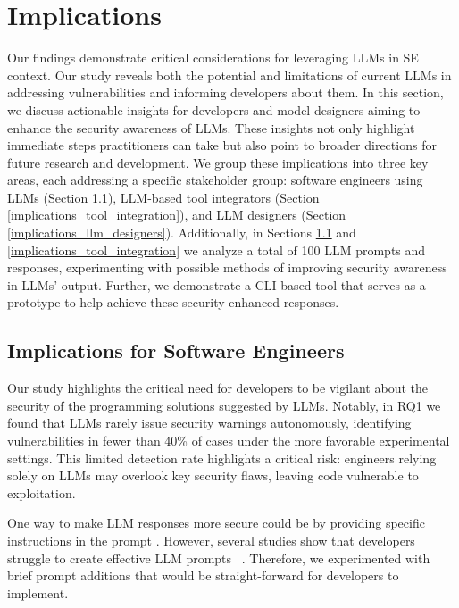 \section{Implications}

Our findings demonstrate critical considerations for leveraging LLMs in SE context. Our study reveals both the potential and limitations of current LLMs in addressing vulnerabilities and informing developers about them. In this section, we discuss actionable insights for developers and model designers aiming to enhance the security awareness of LLMs. These insights not only highlight immediate steps practitioners can take but also point to broader directions for future research and development. We group these implications into three key areas, each addressing a specific stakeholder group: software engineers using LLMs (Section \ref{implications_address_security}), LLM-based tool integrators (Section \ref{implications_tool_integration}), and LLM designers (Section \ref{implications_llm_designers}). Additionally, in Sections \ref{implications_address_security} and \ref{implications_tool_integration} we analyze a total of 100 LLM prompts and responses, experimenting with possible methods of improving security awareness in LLMs' output. Further, we demonstrate a CLI-based tool that serves as a prototype to help achieve these security enhanced responses.

\subsection{Implications for Software Engineers}
\label{implications_address_security}
Our study highlights the critical need for developers to be vigilant about the security of the programming solutions suggested by LLMs. Notably, in RQ1 we found that LLMs rarely issue security warnings autonomously, identifying vulnerabilities in fewer than 40\% of cases under the more favorable experimental settings. This limited detection rate highlights a critical risk: engineers relying solely on LLMs may overlook key security flaws, leaving code vulnerable to exploitation.

One way to make LLM responses more secure could be by providing specific instructions in the prompt \citep{jensen2024software}. 
However, several studies show that developers struggle to create effective LLM prompts ~\citep{chopra2023conversationalchallengesaipowereddata, Nam2024}. Therefore, we experimented with brief prompt additions that would be straight-forward for developers to implement.

